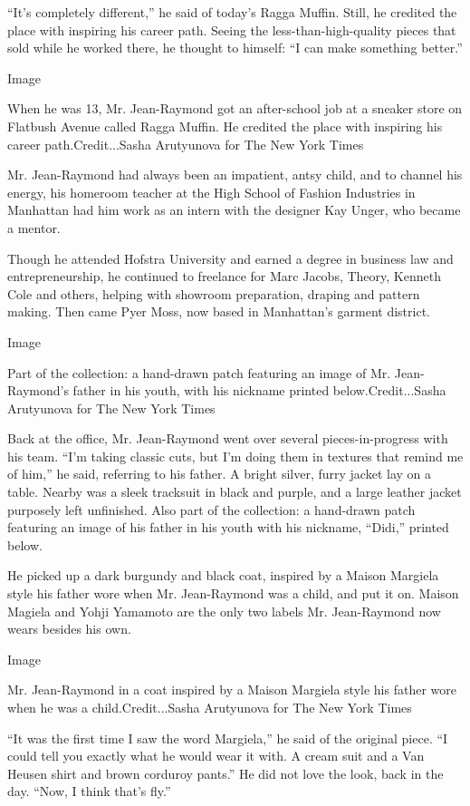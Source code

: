 ``It's completely different,'' he said of today's Ragga Muffin. Still,
he credited the place with inspiring his career path. Seeing the
less-than-high-quality pieces that sold while he worked there, he
thought to himself: ``I can make something better.''

Image

When he was 13, Mr. Jean-Raymond got an after-school job at a sneaker
store on Flatbush Avenue called Ragga Muffin. He credited the place with
inspiring his career path.Credit...Sasha Arutyunova for The New York
Times

Mr. Jean-Raymond had always been an impatient, antsy child, and to
channel his energy, his homeroom teacher at the High School of Fashion
Industries in Manhattan had him work as an intern with the designer Kay
Unger, who became a mentor.

Though he attended Hofstra University and earned a degree in business
law and entrepreneurship, he continued to freelance for Marc Jacobs,
Theory, Kenneth Cole and others, helping with showroom preparation,
draping and pattern making. Then came Pyer Moss, now based in
Manhattan's garment district.

Image

Part of the collection: a hand-drawn patch featuring an image of Mr.
Jean-Raymond's father in his youth, with his nickname printed
below.Credit...Sasha Arutyunova for The New York Times

Back at the office, Mr. Jean-Raymond went over several
pieces-in-progress with his team. ``I'm taking classic cuts, but I'm
doing them in textures that remind me of him,'' he said, referring to
his father. A bright silver, furry jacket lay on a table. Nearby was a
sleek tracksuit in black and purple, and a large leather jacket
purposely left unfinished. Also part of the collection: a hand-drawn
patch featuring an image of his father in his youth with his nickname,
``Didi,'' printed below.

He picked up a dark burgundy and black coat, inspired by a Maison
Margiela style his father wore when Mr. Jean-Raymond was a child, and
put it on. Maison Magiela and Yohji Yamamoto are the only two labels Mr.
Jean-Raymond now wears besides his own.

Image

Mr. Jean-Raymond in a coat inspired by a Maison Margiela style his
father wore when he was a child.Credit...Sasha Arutyunova for The New
York Times

``It was the first time I saw the word Margiela,'' he said of the
original piece. ``I could tell you exactly what he would wear it with. A
cream suit and a Van Heusen shirt and brown corduroy pants.'' He did not
love the look, back in the day. ``Now, I think that's fly.''


